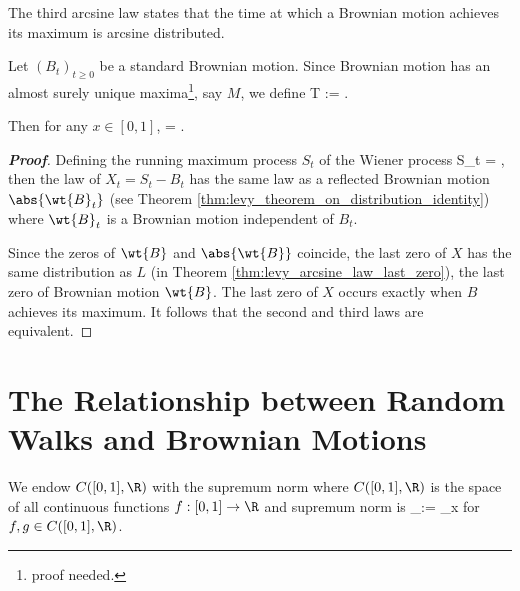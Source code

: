 The third arcsine law states that the time at which a Brownian motion achieves its maximum is arcsine distributed.

\begin{theorem}\label{thm:levy_arcsine_law_position_of_maximum}
Let $(B_t)_{t\geq 0}$ be a standard Brownian motion. Since Brownian motion has an almost surely unique maxima\footnote{proof needed.}, say $M$, we define
\be
T := .
\ee


Then for any $x\in [0,1]$,
\be
\pro{} = \arcsin{}.
\ee
\end{theorem}

\begin{proof}[\bf Proof]
Defining the running maximum process $S_t$ of the Wiener process
\be
S_t = \sup {},
\ee
then the law of $X_t = S_t - B_t$ has the same law as a reflected Brownian motion $\abs{\wt{B}_t}$ (see Theorem \ref{thm:levy_theorem_on_distribution_identity}) where $\wt{B}_t$ is a Brownian motion independent of $B_t$.

Since the zeros of $\wt{B}$ and $\abs{\wt{B}}$ coincide, the last zero of $X$ has the same distribution as $L$ (in Theorem \ref{thm:levy_arcsine_law_last_zero}), the last zero of Brownian motion $\wt{B}$. The last zero of $X$ occurs exactly when $B$ achieves its maximum. It follows that the second and third laws are equivalent.
\end{proof}



\section{The Relationship between Random Walks and Brownian Motions}

We endow $C([0, 1],\R)$ with the supremum norm where $C([0, 1],\R)$ is the space of all continuous functions $f:[0,1]\to\R$ and supremum norm is
\be
{}_\infty := \sup_{x\in [0,1]}
\ee
for $f,g\in C([0,1],\R)$.

